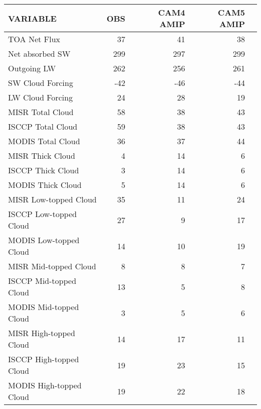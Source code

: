 \begin{tabular}{lrrrr}
\hline
                VARIABLE &                      OBS &                CAM4 AMIP &                CAM5 AMIP \\ \hline
            TOA Net Flux &                       37 &                       41 &                       38 \\
         Net absorbed SW &                      299 &                      297 &                      299 \\
             Outgoing LW &                      262 &                      256 &                      261 \\
        SW Cloud Forcing &                      -42 &                      -46 &                      -44 \\
        LW Cloud Forcing &                       24 &                       28 &                       19 \\
        MISR Total Cloud &                       58 &                       38 &                       43 \\
       ISCCP Total Cloud &                       59 &                       38 &                       43 \\
       MODIS Total Cloud &                       36 &                       37 &                       44 \\
        MISR Thick Cloud &                        4 &                       14 &                        6 \\
       ISCCP Thick Cloud &                        3 &                       14 &                        6 \\
       MODIS Thick Cloud &                        5 &                       14 &                        6 \\
   MISR Low-topped Cloud &                       35 &                       11 &                       24 \\
  ISCCP Low-topped Cloud &                       27 &                        9 &                       17 \\
  MODIS Low-topped Cloud &                       14 &                       10 &                       19 \\
   MISR Mid-topped Cloud &                        8 &                        8 &                        7 \\
  ISCCP Mid-topped Cloud &                       13 &                        5 &                        8 \\
  MODIS Mid-topped Cloud &                        3 &                        5 &                        6 \\
  MISR High-topped Cloud &                       14 &                       17 &                       11 \\
 ISCCP High-topped Cloud &                       19 &                       23 &                       15 \\
 MODIS High-topped Cloud &                       19 &                       22 &                       18 \\ \hline
\end{tabular}
